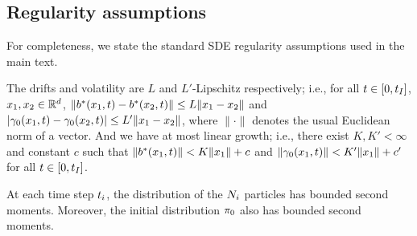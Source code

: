 \subsection{Regularity assumptions}
\label{app:assumptions}

For completeness, we state the standard SDE regularity assumptions used in the main text.

\begin{assumption}
\label{assumption-lipschitz}
The drifts and volatility are $L$ and $L'$-Lipschitz respectively; i.e., for all $t\in [0,t_{I}]$, $\bm{x_1}, \bm{x_2} \in \R^d$, $\|\truedrift(\bm{x_1}, t)-\truedrift(\bm{x_2}, t)\| \le L \| \bm{x_1}-\bm{x_2} \|$ and $|\truevolatility(\bm{x_1}, t)-\truevolatility(\bm{x_2}, t)|\le L' \| \bm{x_1}-\bm{x_2} \|$, where $\|\cdot \|$ denotes the usual Euclidean norm of a vector. And we have at most linear growth; i.e., there exist $K, K'<\infty$ and constant $c$ such that $\| \truedrift(\bm{x_1}, t)\| <K \| \bm{x_1} \|+c$ and $\| \truevolatility(\bm{x_1}, t)\| <K' \| \bm{x_1} \|+c'$ for all $t\in [0,t_{I}]$. 
\end{assumption} 
\begin{assumption}
\label{assumption-bddsecondmoments}
At each time step $t_{i}$, the distribution
of the $N_{i}$ particles has bounded second moments. Moreover, the initial distribution $\pi_{0}$ also has bounded second moments.
\end{assumption}



